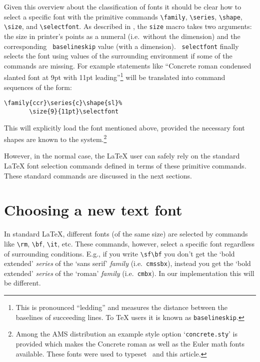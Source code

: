  Given this overview about the classification of fonts it should be
 clear how to select a specific font with the primitive commands
 \verb+\family+, \verb+\series+, \verb+\shape+, \verb+\size+, and
 \verb+\selectfont+.  As described in \cite{basic}, the
 {\tt\bslash size} macro takes two arguments: the size
 in printer's points as a numeral (i.e.~without the
 dimension) and the corresponding {\tt\bslash
 baselineskip} value (with a dimension).  {\tt\bslash
 selectfont} finally selects the font using values of
 the surrounding environment if some of the commands
 are missing.
 For example statements like ``Concrete roman condensed
 slanted font at 9pt with 11pt leading''\footnote{This
 is pronounced ``ledding'' and measures the distance
 between the baselines of succeeding lines. To \TeX{}
 users it is known as {\tt\bslash baselineskip}.} will
 be translated into   command sequences of the form:
\begin{verbatim}
\family{ccr}\series{c}\shape{sl}%
       \size{9}{11pt}\selectfont
\end{verbatim}
 This will explicitly load the font mentioned above,
 provided the necessary font shapes are known to the
 system.\footnote{Among the AMS distribution an example
 style option `{\tt concrete.sty}' is provided which
 makes the Concrete roman as well as the Euler math
 fonts available. These fonts were used to
 typeset~\cite{ConcreteMath}
 and this article.}


 However, in the normal case, the \LaTeX{} user can safely rely on the
 standard \LaTeX{} font selection commands defined in terms
 of these primitive commands. These standard commands are discussed
 in the next sections.


 \section{Choosing a new text font}

 In standard \LaTeX{}, different fonts (of the same size) are selected
 by commands like \verb+\rm+, \verb+\bf+, \verb+\it+, etc.  These
 commands, however, select a specific font regardless of surrounding
 conditions.  E.g., if you write \verb+\sf\bf+ you don't get the `bold
 extended' {\em series\/} of the `sans serif' {\em family\/} (i.e.\
 {\tt cmssbx}), instead you get the `bold extended' {\em series\/} of
 the `roman' {\em family\/} (i.e.\ {\tt cmbx}).  In our
 implementation this will be different.


